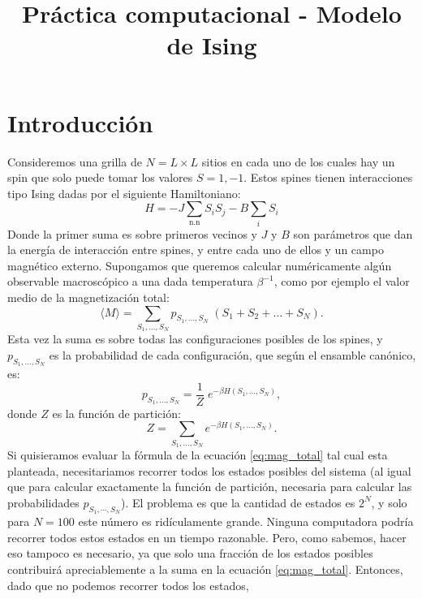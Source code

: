 \documentclass[a4paper,11pt,oneside]{article}
\title{Práctica computacional - Modelo de Ising}
\author{}
\date{}
\newcommand{\mean}[1]{\langle #1 \rangle}
\begin{document}
\maketitle

\section{Introducción}

Consideremos una grilla de $N = L\times L$ sitios en cada uno de los cuales hay
un spin que solo puede tomar los valores $S = 1,-1$. Estos
spines tienen interacciones tipo Ising dadas por el siguiente Hamiltoniano:
\begin{equation}
    H = -J\sum_\text{n.n} S_i S_j - B \sum_i S_i
\end{equation}
Donde la primer suma es sobre primeros vecinos y $J$ y $B$ son parámetros que
dan la energía de interacción entre spines, y entre cada uno de ellos y un
campo magnético externo. Supongamos que queremos calcular numéricamente algún
observable macroscópico a una dada temperatura $\beta^{-1}$, como por ejemplo
el valor medio de la magnetización total:
\begin{equation}
    \mean{M} = \sum_{S_1,\dots,S_N} p_{S_1,\dots,S_N} \; (S_1+S_2+\dots+S_N).
    \label{eq:mag_total}
\end{equation}
Esta vez la suma es sobre todas las configuraciones posibles de los spines, y
$p_{S_1,\dots,S_N}$ es la probabilidad de cada configuración, que según el
ensamble canónico, es:
\begin{equation}
    p_{S_1,\dots,S_N} = \frac{1}{Z} \; e^{-\beta H(S_1,\dots,S_N)},
\end{equation}
donde $Z$ es la función de partición:
\begin{equation}
    Z = \sum_{S_1,\dots,S_N} e^{-\beta H(S_1,\dots,S_N)}.
\end{equation}
Si quisieramos evaluar la fórmula de la ecuación \ref{eq:mag_total} tal cual esta planteada,
necesitariamos recorrer todos los estados posibles del sistema (al igual que
para calcular exactamente la función de partición, necesaria para calcular las
probabilidades $p_{S_1,\cdots,S_N}$). El problema es que la cantidad de estados
es $2^{N}$, y solo para $N=100$ este número es ridículamente grande. Ninguna
computadora podría recorrer todos estos estados en un tiempo razonable. Pero,
como sabemos, hacer eso tampoco es necesario, ya que solo una fracción de los
estados posibles contribuirá apreciablemente a la suma en la ecuación
\ref{eq:mag_total}. Entonces, dado que no podemos recorrer todos los estados,
\end{document}
